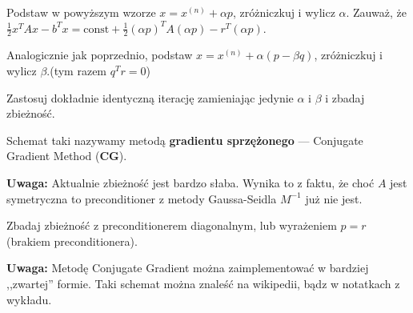 \documentclass{instrukcja}
\begin{document}
\begin{zad} Podstaw w powyższym wzorze $x = x^{(n)} + \alpha p$, zróżniczkuj i wylicz $\alpha$. Zauważ, że $\frac{1}{2}x^TAx - b^Tx = \text{const} + \frac{1}{2}(\alpha p)^TA(\alpha p) - r^T(\alpha p)$.\end{zad}

\begin{zad} Analogicznie jak poprzednio, podstaw $x = x^{(n)} + \alpha (p-\beta q)$, zróżniczkuj i wylicz $\beta$.(tym razem $q^Tr = 0$)\end{zad}

\begin{zad} Zastosuj dokładnie identyczną iterację zamieniając jedynie $\alpha$ i $\beta$ i zbadaj zbieżność.\end{zad}

Schemat taki nazywamy metodą {\bf gradientu sprzężonego} --- Conjugate Gradient Method ({\bf CG}).

{\bf Uwaga:} Aktualnie zbieżność jest bardzo słaba. Wynika to z faktu, że choć $A$ jest symetryczna to preconditioner z metody Gaussa-Seidla $M^{-1}$ już nie jest.

\begin{zad} Zbadaj zbieżność z preconditionerem diagonalnym, lub wyrażeniem $p=r$ (brakiem preconditionera).\end{zad}

{\bf Uwaga:} Metodę Conjugate Gradient można zaimplementować w bardziej ,,zwartej'' formie. Taki schemat można znaleść na wikipedii, bądz w notatkach z wykładu.
\end{document}
